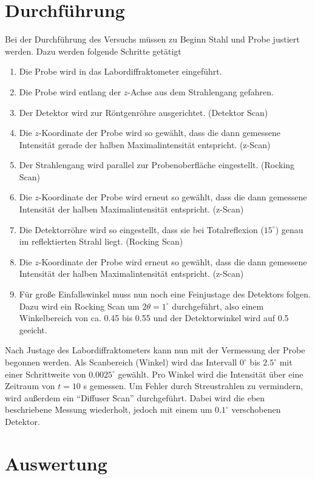 \section{Durchführung}
Bei der Durchführung des Versuchs müssen zu Beginn Stahl und Probe justiert werden. Dazu werden folgende Schritte getätigt
\begin{enumerate}
 \item Die Probe wird in das Labordiffraktometer eingeführt.
 \item Die Probe wird entlang der $z$-Achse aus dem Strahlengang gefahren.
 \item Der Detektor wird zur Röntgenröhre ausgerichtet. (Detektor Scan)
 \item Die $z$-Koordinate der Probe wird so gewählt, dass die dann gemessene Intensität gerade der halben Maximalintensität entspricht. (z-Scan)
 \item Der Strahlengang wird parallel zur Probenoberfläche eingestellt. (Rocking Scan)
 \item Die $z$-Koordinate der Probe wird erneut so gewählt, dass die dann gemessene Intensität der halben Maximalintensität entspricht. (z-Scan)
 \item Die Detektorröhre wird so eingestellt, dass sie bei Totalreflexion ($15^\circ$) genau im reflektierten Strahl liegt. (Rocking Scan)
 \item Die $z$-Koordinate der Probe wird erneut so gewählt, dass die dann gemessene Intensität der halben Maximalintensität entspricht. (z-Scan)
 \item Für große Einfallswinkel muss nun noch eine Feinjustage des Detektors folgen. Dazu wird ein Rocking Scan um $2\theta=1^\circ$ durchgeführt, also einem
 Winkelbereich von ca. 0.45 bis 0.55 und der Detektorwinkel wird auf 0.5 geeicht.
\end{enumerate}
Nach Justage des Labordiffraktometers kann nun mit der Vermessung der Probe begonnen werden. Als Scanbereich (Winkel) wird das Intervall $0^\circ$ bis 
$2.5^\circ$ mit einer Schrittweite von $0.0025^\circ$ gewählt. Pro Winkel wird die Intensität über eine Zeitraum von $t=10$ s gemessen. Um Fehler durch
Streustrahlen zu vermindern, wird außerdem ein ``Diffuser Scan'' durchgeführt. Dabei wird die eben beschriebene Messung wiederholt, jedoch mit einem um
$0.1^\circ$ verschobenen Detektor.

\section{Auswertung}






